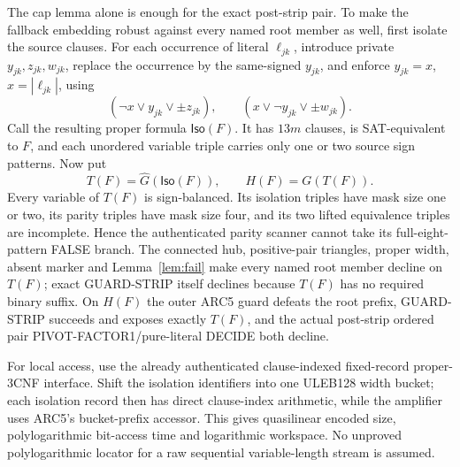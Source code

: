 \documentclass[11pt]{article}
\begin{document}
The cap lemma alone is enough for the exact post-strip pair.  To make the
fallback embedding robust against every named root member as well, first
isolate the source clauses.  For each occurrence of literal $\ell_{jk}$,
introduce private $y_{jk},z_{jk},w_{jk}$, replace the occurrence by the
same-signed $y_{jk}$, and enforce $y_{jk}=x$, $x=|\ell_{jk}|$, using
\[
 (\neg x\vee y_{jk}\vee\pm z_{jk}),\qquad
 (x\vee\neg y_{jk}\vee\pm w_{jk}).                       \tag{10}
\]
Call the resulting proper formula $\mathsf{Iso}(F)$.  It has $13m$ clauses,
is SAT-equivalent to $F$, and each unordered variable triple carries only
one or two source sign patterns.  Now put
\[
 T(F)=\widehat G(\mathsf{Iso}(F)),\qquad H(F)=G(T(F)).     \tag{11}
\]
Every variable of $T(F)$ is sign-balanced.  Its isolation triples have mask
size one or two, its parity triples have mask size four, and its two lifted
equivalence triples are incomplete.  Hence the authenticated parity scanner
cannot take its full-eight-pattern FALSE branch.  The connected hub,
positive-pair triangles, proper width, absent marker and
Lemma~\ref{lem:fail} make every named root member decline on $T(F)$; exact
GUARD-STRIP itself declines because $T(F)$ has no required binary suffix.
On $H(F)$ the outer ARC5 guard defeats the root prefix, GUARD-STRIP succeeds
and exposes exactly $T(F)$, and the actual post-strip ordered pair
PIVOT-FACTOR1/pure-literal DECIDE both decline.

For local access, use the already authenticated clause-indexed fixed-record
proper-3CNF interface.  Shift the isolation identifiers into one ULEB128
width bucket; each isolation record then has direct clause-index arithmetic,
while the amplifier uses ARC5's bucket-prefix accessor.  This gives
quasilinear encoded size, polylogarithmic bit-access time and logarithmic
workspace.  No unproved polylogarithmic locator for a raw sequential
variable-length stream is assumed.
\end{document}
